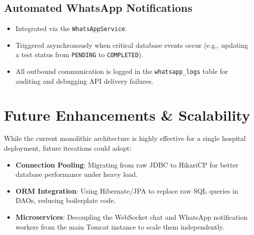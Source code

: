 \documentclass[12pt,a4paper]{article}
\begin{document}
\subsection{Automated WhatsApp Notifications}
\begin{itemize}
    \item Integrated via the \texttt{WhatsAppService}.
    \item Triggered asynchronously when critical database events occur (e.g., updating a test status from \texttt{PENDING} to \texttt{COMPLETED}).
    \item All outbound communication is logged in the \texttt{whatsapp\_logs} table for auditing and debugging API delivery failures.
\end{itemize}

\section{Future Enhancements \& Scalability}
While the current monolithic architecture is highly effective for a single hospital deployment, future iterations could adopt:
\begin{itemize}
    \item \textbf{Connection Pooling}: Migrating from raw JDBC to HikariCP for better database performance under heavy load.
    \item \textbf{ORM Integration}: Using Hibernate/JPA to replace raw SQL queries in DAOs, reducing boilerplate code.
    \item \textbf{Microservices}: Decoupling the WebSocket chat and WhatsApp notification workers from the main Tomcat instance to scale them independently.
\end{itemize}
\end{document}
